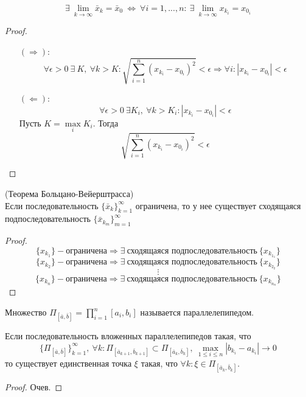 \begin{theorem}
    \[\exists\ \lim\limits_{k\to \infty}\bar{x}_k=\bar{x}_0\ \Leftrightarrow\ \forall i=1,...,n:\ \exists\ \lim\limits_{k\to \infty}x_{k_i}=x_{0_i}\]
\end{theorem} 
\begin{proof}\tab
    \begin{itemize}
        \item[$(\Rightarrow)$:] \[\forall \epsilon>0\ \exists\ K,\ \forall k>K: \sqrt{\sum\limits_{i=1}^{n}(x_{k_i}-x_{0_i})^2}<\epsilon \Rightarrow \forall i: |x_{k_i}-x_{0_i}|<\epsilon\]
        \item[$(\Leftarrow)$:] \[\forall \epsilon>0\ \exists K_i,\ \forall k>K_i: |x_{k_i}-x_{0_i}|<\epsilon\]
        Пусть $K=\max\limits_i K_i$. Тогда
        \[\sqrt{\sum\limits_{i=1}^{n}(x_{k_i}-x_{0_i})^2}<\epsilon\]
    \end{itemize}
\end{proof} 
\begin{theorem} (Теорема Больцано-Вейерштрасса)\\
    Если последовательность $\{\bar{x}_k\}_{k=1}^{\infty}$ ограничена, то у нее существует сходящаяся подпоследовательность $\{\bar{x}_{k_m}\}_{m=1}^{\infty}$
\end{theorem} 
\begin{proof}
    \[\{x_{k_1}\} - \text{ограничена} \Rightarrow \exists\ \text{сходящаяся подпоследовательность}\ \{x_{k_{1_1}}\}\]
    \[\{x_{k_2}\} - \text{ограничена} \Rightarrow \exists\ \text{сходящаяся подпоследовательность}\ \{x_{k_{2_2}}\}\]
    \[\vdots\]
    \[\{x_{k_n}\} - \text{ограничена} \Rightarrow \exists\ \text{сходящаяся подпоследовательность}\ \{x_{k_{n_n}}\}\]
\end{proof} 
\begin{definition}
    Множество $\Pi_{[\bar{a}, \bar{b}]}=\prod\limits_{i=1}^{n}[a_i,b_i]$ называется параллелепипедом.
\end{definition} 
\begin{theorem}
    Если последовательность вложенных параллелепипедов такая, что
    \[\{\Pi_{[\bar{a}, \bar{b}]}\}_{k=1}^{\infty},\ \forall k: \Pi_{[\bar{a}_{k+1}, \bar{b}_{k+1}]} \subset \Pi_{[\bar{a}_{k}, \bar{b}_{k}]},\ \max\limits_{1\leq i\leq n}|b_{k_i}-a_{k_i}| \to 0\]
    то существует единственная точка $\xi$ такая, что $\forall k: \xi\in \Pi_{[\bar{a}_k, \bar{b}_k]}$.
\end{theorem} 
\begin{proof}
    Очев.
\end{proof}
